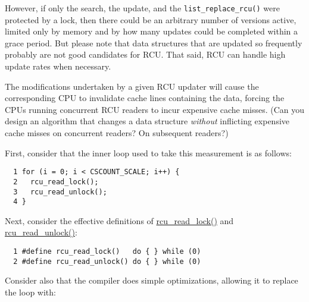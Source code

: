 However, if only the search, the update, and the
{\tt list\_replace\_rcu()} were protected by a lock, then
there could be an arbitrary number of versions active, limited only
by memory and by how many updates could be completed within a
grace period.
But please note that data structures that are updated so frequently
probably are not good candidates for RCU.
That said, RCU can handle high update rates when necessary.


The modifications undertaken by a given RCU updater will cause the
corresponding CPU to invalidate cache lines containing the data,
forcing the CPUs running concurrent RCU readers to incur expensive
cache misses.
(Can you design an algorithm that changes a data structure \emph{without}
inflicting expensive cache misses on concurrent readers?
On subsequent readers?)


First, consider that the inner loop used to
take this measurement is as follows:

\vspace{5pt}
\begin{minipage}[t]{\columnwidth}
\small
\begin{verbatim}
  1 for (i = 0; i < CSCOUNT_SCALE; i++) {
  2   rcu_read_lock();
  3   rcu_read_unlock();
  4 }
\end{verbatim}
\end{minipage}
\vspace{5pt}

Next, consider the effective definitions of \url{rcu_read_lock()}
and \url{rcu_read_unlock()}:

\vspace{5pt}
\begin{minipage}[t]{\columnwidth}
\small
\begin{verbatim}
  1 #define rcu_read_lock()   do { } while (0)
  2 #define rcu_read_unlock() do { } while (0)
\end{verbatim}
\end{minipage}
\vspace{5pt}

Consider also that the compiler does simple optimizations,
allowing it to replace the loop with:

